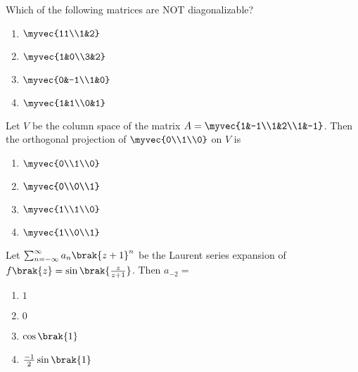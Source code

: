 \item{
Which of the following matrices are NOT diagonalizable?
\begin{multicols}{4}
\begin{enumerate}
\item $\myvec{11\\1&2}$
\item $\myvec{1&0\\3&2}$
\item $\myvec{0&-1\\1&0}$ 
\item $\myvec{1&1\\0&1}$
\end{enumerate}
\end{multicols}
}
\item{
Let $V$ be the column space of the matrix $A=\myvec{1&-1\\1&2\\1&-1}$. Then the orthogonal projection of $\myvec{0\\1\\0}$ on $V$ is
\begin{multicols}{4}
\begin{enumerate}
\item $\myvec{0\\1\\0}$
\item $\myvec{0\\0\\1}$
\item $\myvec{1\\1\\0}$
\item $\myvec{1\\0\\1}$
\end{enumerate}
\end{multicols}
}
\item{
Let $\sum_{n=-\infty}^\infty a_n\brak{z+1}^n$ be the Laurent series expansion of $f\brak{z}=\sin\brak{\frac{z}{z+1}}$. Then $a_{-2}=$
\begin{multicols}{4}
\begin{enumerate}
\item $1$
\item $0$
\item $\cos\brak{1}$
\item $\frac{-1}{2}\sin\brak{1}$
\end{enumerate}
\end{multicols}
}
